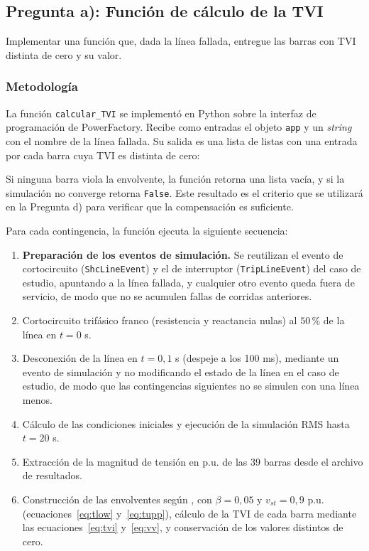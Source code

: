 \subsection{Pregunta a): Función de cálculo de la TVI}

Implementar una función que, dada la línea fallada, entregue las barras con TVI distinta de cero y su valor.

\subsubsection{Metodología}

La función \texttt{calcular\_TVI} se implementó en Python sobre la interfaz de programación de PowerFactory. Recibe como entradas el objeto \texttt{app} y un \textit{string} con el nombre de la línea fallada. Su salida es una lista de listas con una entrada por cada barra cuya TVI es distinta de cero:

\begin{center}
\end{center}

Si ninguna barra viola la envolvente, la función retorna una lista vacía, y si la simulación no converge retorna \texttt{False}. Este resultado es el criterio que se utilizará en la Pregunta d) para verificar que la compensación es suficiente.

Para cada contingencia, la función ejecuta la siguiente secuencia:

\begin{enumerate}
    \item \textbf{Preparación de los eventos de simulación.} Se reutilizan el evento de cortocircuito (\texttt{ShcLineEvent}) y el de interruptor (\texttt{TripLineEvent}) del caso de estudio, apuntando a la línea fallada, y cualquier otro evento queda fuera de servicio, de modo que no se acumulen fallas de corridas anteriores.
    \item Cortocircuito trifásico franco (resistencia y reactancia nulas) al $50$\,\% de la línea en $t = 0$ s.
    \item Desconexión de la línea en $t = 0{,}1$ s (despeje a los 100 ms), mediante un evento de simulación y no modificando el estado de la línea en el caso de estudio, de modo que las contingencias siguientes no se simulen con una línea menos.
    \item Cálculo de las condiciones iniciales y ejecución de la simulación RMS hasta $t = 20$ s.
    \item Extracción de la magnitud de tensión en p.u. de las 39 barras desde el archivo de resultados.
    \item Construcción de las envolventes según \cite{wildenhues}, con $\beta = 0{,}05$ y $v_{st} = 0{,}9$ p.u. (ecuaciones~\eqref{eq:tlow} y~\eqref{eq:tupp}), cálculo de la TVI de cada barra mediante las ecuaciones~\eqref{eq:tvi} y~\eqref{eq:vv}, y conservación de los valores distintos de cero.
\end{enumerate}

